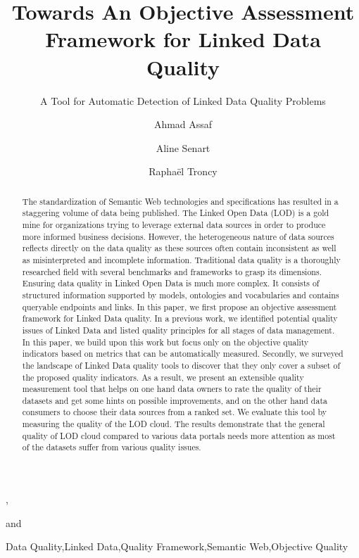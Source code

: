 \documentclass[onecolumn, crcready]{iosart2c}
\begin{document}
\begin{frontmatter}


\title{Towards An Objective Assessment Framework for Linked Data Quality}
\subtitle{A Tool for Automatic Detection of Linked Data Quality Problems}
\author[A,B]{Ahmad Assaf}, \author[A]{Aline Senart} and
\author[B]{Rapha\"{e}l Troncy}
\address[A]{SAP Research, SAP Labs France SAS,\\
805 avenue du Dr. Maurice Donat, BP 1216, 06254 Mougins Cedex, France\\
}
\address[B]{EURECOM,\\
2229 route des cretes, 06560 Sophia Antipolis, France\\
}


\begin{abstract}
The standardization of Semantic Web technologies and specifications has resulted in a staggering volume of data being published. The Linked Open Data (LOD) is a gold mine for organizations trying to leverage external data sources in order to produce more informed business decisions. However, the heterogeneous nature of data sources reflects directly on the data quality as these sources often contain inconsistent as well as misinterpreted and incomplete information. Traditional data quality is a thoroughly researched field with several benchmarks and frameworks to grasp its dimensions. Ensuring data quality in Linked Open Data is much more complex. It consists of structured information supported by models, ontologies and vocabularies and contains queryable endpoints and links. In this paper, we first propose an objective assessment framework for Linked Data quality. In a previous work, we identified potential quality issues of Linked Data and listed quality principles for all stages of data management. In this paper, we build upon this work but focus only on the objective quality indicators based on metrics that can be automatically measured. Secondly, we surveyed the landscape of Linked Data quality tools to discover that they only cover a subset of the proposed quality indicators. As a result, we present an extensible quality measurement tool that helps on one hand data owners to rate the quality of their datasets and get some hints on possible improvements, and on the other hand data consumers to choose their data sources from a ranked set. We evaluate this tool by measuring the quality of the LOD cloud. The results demonstrate that the general quality of LOD cloud compared to various data portals needs more attention as most of the datasets suffer from various quality issues.
\end{abstract}

\begin{keyword}
Data Quality\sep Linked Data\sep Quality Framework\sep Semantic Web\sep Objective Quality
\end{keyword}
\end{frontmatter}
\end{document}
